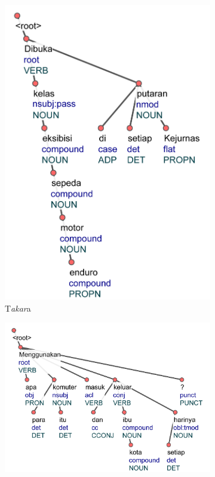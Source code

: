 \begin{figure}
\centering

\begin{subfigure}{.42\linewidth}
  \centering
  \includegraphics[width=1\linewidth] {pics/ts770.jpg} 
	\caption{T\textit{akar}a}
	\label{fig:ts770} 
\end{subfigure}
%
\begin{subfigure}{.57\linewidth}
  \centering
  \includegraphics[width=1\linewidth]{pics/ts7458.jpg} 

\end{subfigure}
\end{figure}
